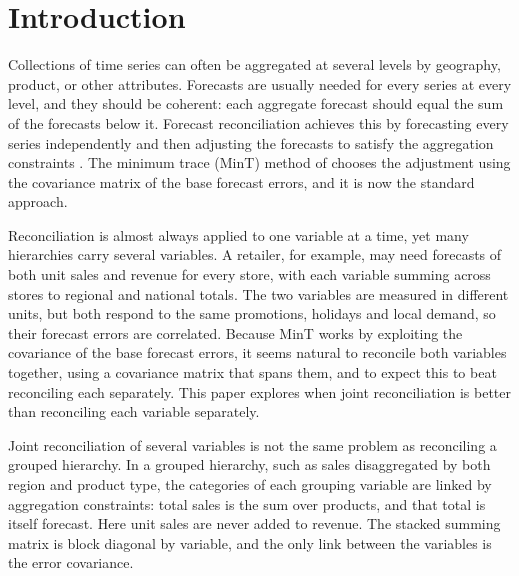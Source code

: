 \section{Introduction}
\label{sec:intro}

Collections of time series can often be aggregated at several levels by geography, product, or other attributes. Forecasts are usually needed for every series at every level, and they should be coherent: each aggregate forecast should equal the sum of the forecasts below it. Forecast reconciliation achieves this by forecasting every series independently and then adjusting the forecasts to satisfy the aggregation constraints \citep{hyndman2011optimal,athanasopoulos2023forecast}. The minimum trace (MinT) method of \citet{wickramasuriya2019optimal} chooses the adjustment using the covariance matrix of the base forecast errors, and it is now the standard approach.

Reconciliation is almost always applied to one variable at a time, yet many hierarchies carry several variables. A retailer, for example, may need forecasts of both unit sales and revenue for every store, with each variable summing across stores to regional and national totals. The two variables are measured in different units, but both respond to the same promotions, holidays and local demand, so their forecast errors are correlated. Because MinT works by exploiting the covariance of the base forecast errors, it seems natural to reconcile both variables together, using a covariance matrix that spans them, and to expect this to beat reconciling each separately. This paper explores when joint reconciliation is better than reconciling each variable separately.

Joint reconciliation of several variables is not the same problem as reconciling a grouped hierarchy. In a grouped hierarchy, such as sales disaggregated by both region and product type, the categories of each grouping variable are linked by aggregation constraints: total sales is the sum over products, and that total is itself forecast. Here unit sales are never added to revenue. The stacked summing matrix is block diagonal by variable, and the only link between the variables is the error covariance.

